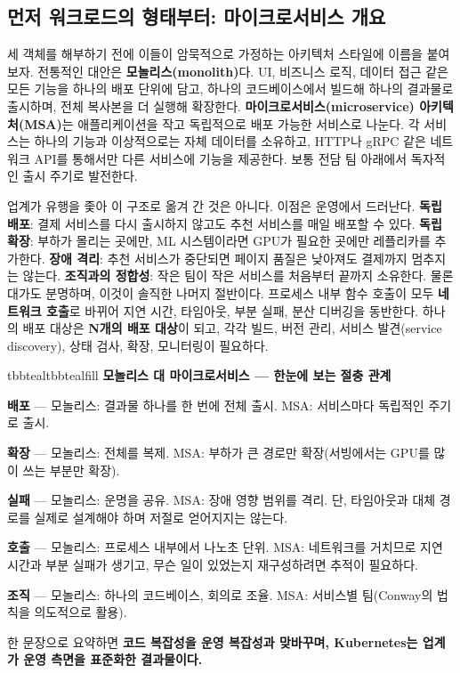 \subsection*{먼저 워크로드의 형태부터: 마이크로서비스 개요}

세 객체를 해부하기 전에 이들이 암묵적으로 가정하는 아키텍처 스타일에 이름을 붙여 보자. 전통적인 대안은 \textbf{모놀리스(monolith)}다. UI, 비즈니스 로직, 데이터 접근 같은 모든 기능을 하나의 배포 단위에 담고, 하나의 코드베이스에서 빌드해 하나의 결과물로 출시하며, 전체 복사본을 더 실행해 확장한다. \textbf{마이크로서비스(microservice) 아키텍처(MSA)}는 애플리케이션을 작고 독립적으로 배포 가능한 서비스로 나눈다. 각 서비스는 하나의 기능과 이상적으로는 자체 데이터를 소유하고, HTTP나 gRPC 같은 네트워크 API를 통해서만 다른 서비스에 기능을 제공한다. 보통 전담 팀 아래에서 독자적인 출시 주기로 발전한다.

업계가 유행을 좇아 이 구조로 옮겨 간 것은 아니다. 이점은 운영에서 드러난다. \textbf{독립 배포}: 결제 서비스를 다시 출시하지 않고도 추천 서비스를 매일 배포할 수 있다. \textbf{독립 확장}: 부하가 몰리는 곳에만, ML 시스템이라면 GPU가 필요한 곳에만 레플리카를 추가한다. \textbf{장애 격리}: 추천 서비스가 중단되면 페이지 품질은 낮아져도 결제까지 멈추지는 않는다. \textbf{조직과의 정합성}: 작은 팀이 작은 서비스를 처음부터 끝까지 소유한다. 물론 대가도 분명하며, 이것이 솔직한 나머지 절반이다. 프로세스 내부 함수 호출이 모두 \textbf{네트워크 호출}로 바뀌어 지연 시간, 타임아웃, 부분 실패, 분산 디버깅을 동반한다. 하나의 배포 대상은 \textbf{N개의 배포 대상}이 되고, 각각 빌드, 버전 관리, 서비스 발견(service discovery), 상태 검사, 확장, 모니터링이 필요하다.

\begin{calloutbox}{tbbteal}{tbbtealfill}
{\normalsize\bfseries\color{tbbteal}모놀리스 대 마이크로서비스 — 한눈에 보는 절충 관계}\par\vspace{3pt}
\begin{tbbitemize}
  \item \textbf{배포} — 모놀리스: 결과물 하나를 한 번에 전체 출시. MSA: 서비스마다 독립적인 주기로 출시.
  \item \textbf{확장} — 모놀리스: 전체를 복제. MSA: 부하가 큰 경로만 확장(서빙에서는 GPU를 많이 쓰는 부분만 확장).
  \item \textbf{실패} — 모놀리스: 운명을 공유. MSA: 장애 영향 범위를 격리. 단, 타임아웃과 대체 경로를 실제로 설계해야 하며 저절로 얻어지지는 않는다.
  \item \textbf{호출} — 모놀리스: 프로세스 내부에서 나노초 단위. MSA: 네트워크를 거치므로 지연 시간과 부분 실패가 생기고, 무슨 일이 있었는지 재구성하려면 추적이 필요하다.
  \item \textbf{조직} — 모놀리스: 하나의 코드베이스, 회의로 조율. MSA: 서비스별 팀(Conway의 법칙을 의도적으로 활용).
\end{tbbitemize}

한 문장으로 요약하면 \textbf{코드 복잡성을 운영 복잡성과 맞바꾸며, Kubernetes는 업계가 운영 측면을 표준화한 결과물이다.}
\end{calloutbox}

